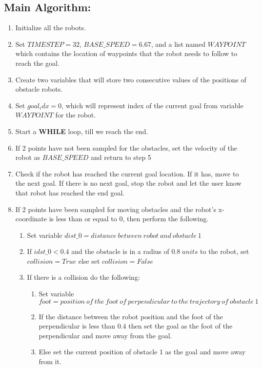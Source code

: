 \documentclass[12pt]{article}
\begin{document}
	\subsection*{Main Algorithm:}
	\begin{enumerate}
		\item Initialize all the robots.
		\item Set $TIMESTEP = 32$, $BASE\_SPEED = 6.67$, and a list named $WAYPOINT$ which contains the location of waypoints that the robot needs to follow to reach the goal.
		\item Create two variables that will store two consecutive values of the positions of obstacle robots.
		\item Set $goal_idx = 0$, which will represent index of the current goal from variable $WAYPOINT$ for the robot.
		\item Start a \textbf{WHILE} loop, till we reach the end.
		\item If 2 points have not been sampled for the obstacles, set the velocity of the robot as $BASE\_SPEED$ and return to step 5
		\item Check if the robot has reached the current goal location. If it has, move to the next goal. If there is no next goal, stop the robot and let the user know that robot has reached the end goal.
		\item If 2 points have been sampled for moving obstacles and the robot's x-coordinate is less than or equal to $0$, then perform the following.
		\begin{enumerate}
			\item Set variable $dist\_0 = distance\ between\ robot\ and\ obstacle\ 1$
			\item If $idst\_0 < 0.4$ and the obstacle is in a radius of $0.8\ units$ to the robot, set $collision = True$ else set $collision = False$
			\item If there is a collision do the following:
			\begin{enumerate}
				\item Set variable $foot = position\ of\ the\ foot\ of\ perpendicular\ to\ the\ trajectory\ of\ obstacle\ 1$
				\item If the distance between the robot position and the foot of the perpendicular is less than $0.4$ then set the goal as the foot of the perpendicular and move away from the goal.
				\item Else set the current position of obstacle 1 as the goal and move away from it.
			\end{enumerate}

\end{enumerate}
\end{enumerate}
\end{document}
